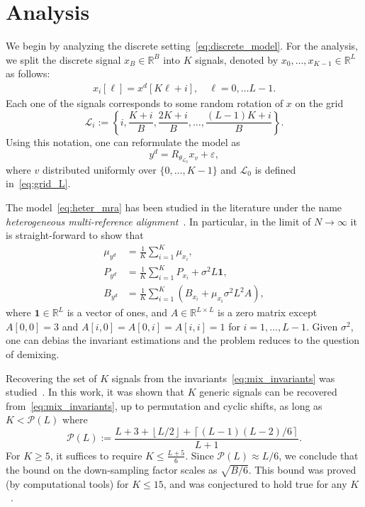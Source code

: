 \documentclass[english,12pt]{article}
\numberwithin{equation}{section}
\numberwithin{mytheorem}{section} %
\begin{document}
\section{Analysis}

We begin by analyzing the discrete setting~\eqref{eq:discrete_model}. For the analysis, we split the discrete signal $x_B\in\mathbb{R}^B$ into $K$ signals, denoted by $x_0,\ldots,x_{K-1}\in\mathbb{R}^L$ as follows:
\begin{eqnarray}
x_i[\ell] = x^d[K\ell+i], \quad \ell=0,\ldots L-1. 
\end{eqnarray}
Each one of the signals corresponds to some random rotation of $x$ on the grid  $$\mathcal{L}_i:=\left\{i,\frac{K+i}{B},\frac{2K+i}{B},\ldots,\frac{(L-1)K+i}{B}\right\}.$$
Using this notation, one can reformulate the model as 
\begin{equation} \label{eq:heter_mra}
y^d =  R_{\theta_{\mathcal{L}_0}} x_{v} + \varepsilon,
\end{equation}
where $v$ distributed uniformly over $\{0,\ldots,K-1\}$ and $\mathcal{L}_0$ is defined in~\eqref{eq:grid_L}. 

The model~\eqref{eq:heter_mra} has been studied in the literature under the name \emph{heterogeneous multi-reference alignment}~\cite{perry2017sample,bandeira2017estimation,boumal2018heterogeneous}. In particular, in the limit of $N\to\infty$ it is straight-forward to show that 
\begin{align} \label{eq:mix_invariants}
\mu_{y^d} &= \frac{1}{K}\sum_{i=1}^K \mu_{x_i}, \nonumber\\
P_{y^d} &= \frac{1}{K}\sum_{i=1}^K P_{x_i} + \sigma^2L\mathbf{1}, \\
B_{y^d} &= \frac{1}{K}\sum_{i=1}^K (B_{x_i} +\mu_{x_i}\sigma^2L^2 A ), \nonumber
\end{align}
where $\mathbf{1}\in\mathbb{R}^L$ is a vector of ones, and $A\in\mathbb{R}^{L\times L}$ is a zero matrix except $A[0,0]=3$ and $A[i,0]=A[0,i]=A[i,i]=1$ for $i=1,\ldots,L-1$.
Given $\sigma^2$, one can debias the invariant estimations and the problem reduces to the question of demixing.

Recovering the set of $K$ signals from the invariants~\eqref{eq:mix_invariants} was studied~\cite{bandeira2017estimation}. In this work, it was shown that $K$ generic signals can be recovered from~\eqref{eq:mix_invariants}, up to permutation and cyclic shifts, as long as $K<\mathcal{P}(L)$ where
\begin{equation} \label{eq:Pl}
\mathcal{P}(L) := \frac{L+3+\left\lfloor L/2\right\rfloor +  \left\lceil (L-1)(L-2)/6\right\rceil}{L+1}.
\end{equation}
For $K\geq 5$, it suffices to require $K\leq \frac{L+5}{6}$. 
Since $\mathcal{P}(L) \approx L/6$, we conclude that the bound on the down-sampling factor scales as $\sqrt{B/6}$.
This bound was proved (by computational tools) for $K\leq 15$, and was conjectured to hold true for any $K$~\cite{bandeira2017estimation}.
\end{document}

